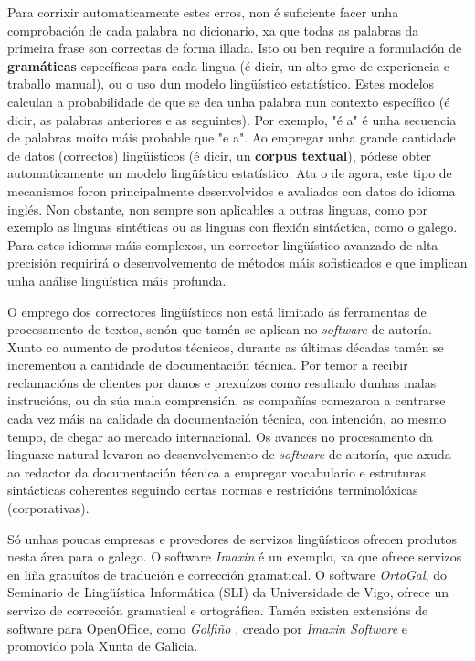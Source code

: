 \begin{multicols}{2}
Para corrixir automaticamente estes erros, non é suficiente facer unha comprobación de cada palabra no dicionario, xa que todas as palabras da primeira frase son correctas de forma illada. Isto ou ben require a formulación de \textbf{gramáticas} específicas para cada lingua (é dicir, un alto grao de experiencia e traballo manual), ou o uso dun modelo lingüístico estatístico. Estes modelos calculan a probabilidade de que se dea unha palabra nun contexto específico (é dicir, as palabras anteriores e as seguintes). Por exemplo, "é a" é unha secuencia de palabras moito máis probable que "e a". Ao empregar unha grande cantidade de datos (correctos) lingüísticos (é dicir, un \textbf{corpus textual}), pódese obter automaticamente un modelo lingüístico estatístico. Ata o de agora, este tipo de mecanismos foron principalmente desenvolvidos e avaliados con datos do idioma inglés. Non obstante, non sempre son aplicables a outras linguas, como por exemplo as linguas sintéticas ou as linguas con flexión sintáctica, como o galego. Para estes idiomas máis complexos, un corrector lingüístico avanzado de alta precisión requirirá o desenvolvemento de métodos máis sofisticados e que implican unha análise lingüística máis profunda.


O emprego dos correctores lingüísticos non está limitado ás ferramentas de procesamento de textos, senón que tamén se aplican no \textit{software} de autoría. Xunto co aumento de produtos técnicos, durante as últimas décadas tamén se incrementou a cantidade de documentación técnica. Por temor a recibir reclamacións de clientes por danos e prexuízos como resultado dunhas malas instrucións, ou da súa mala comprensión, as compañías comezaron a centrarse cada vez máis na calidade da documentación técnica, coa intención, ao mesmo tempo, de chegar ao mercado internacional. Os avances no procesamento da linguaxe natural levaron ao desenvolvemento de \textit{software} de autoría, que axuda ao redactor da documentación técnica a empregar vocabulario e estruturas sintácticas coherentes seguindo certas normas e restricións terminolóxicas (corporativas). 



Só unhas poucas empresas e provedores de servizos lingüísticos ofrecen produtos nesta área para o galego. O software \textit{Imaxin} \cite{GAL-Nota21}  é un exemplo, xa que ofrece servizos en liña gratuítos de tradución e corrección gramatical. O software \textit{OrtoGal}, do Seminario de Lingüística Informática (SLI) \cite{GAL-Nota22} da Universidade de Vigo, ofrece un servizo de corrección gramatical e ortográfica. Tamén existen extensións de software para OpenOffice, como \textit{Golfiño} \cite{GAL-Nota23}, creado por \textit{Imaxin Software} e promovido pola Xunta de Galicia.


\end{multicols}
